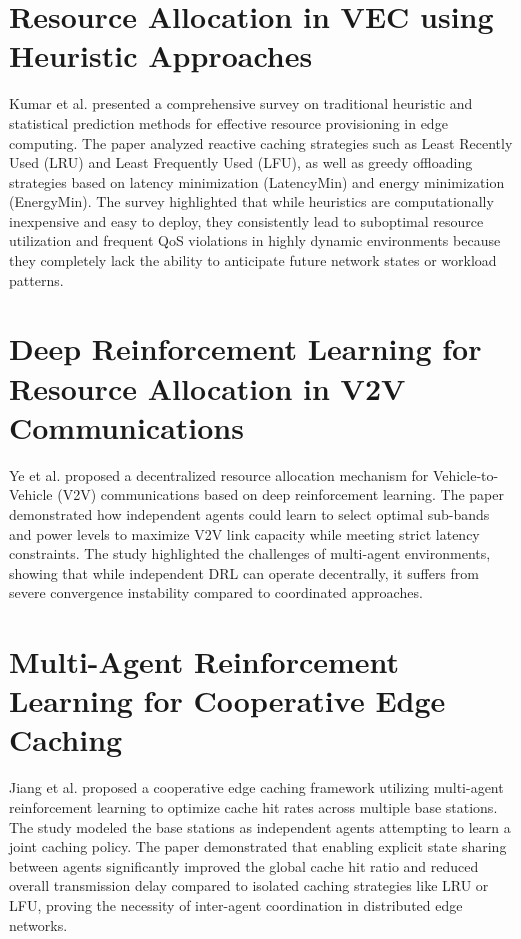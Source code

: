 \documentclass[12pt,a4paper]{report}
\begin{document}
\section{Resource Allocation in VEC using Heuristic Approaches}
Kumar et al. presented a comprehensive survey on traditional heuristic and statistical prediction methods for effective resource provisioning in edge computing. The paper analyzed reactive caching strategies such as Least Recently Used (LRU) and Least Frequently Used (LFU), as well as greedy offloading strategies based on latency minimization (LatencyMin) and energy minimization (EnergyMin). The survey highlighted that while heuristics are computationally inexpensive and easy to deploy, they consistently lead to suboptimal resource utilization and frequent QoS violations in highly dynamic environments because they completely lack the ability to anticipate future network states or workload patterns.

\section{Deep Reinforcement Learning for Resource Allocation in V2V Communications}
Ye et al. proposed a decentralized resource allocation mechanism for Vehicle-to-Vehicle (V2V) communications based on deep reinforcement learning. The paper demonstrated how independent agents could learn to select optimal sub-bands and power levels to maximize V2V link capacity while meeting strict latency constraints. The study highlighted the challenges of multi-agent environments, showing that while independent DRL can operate decentrally, it suffers from severe convergence instability compared to coordinated approaches.

\section{Multi-Agent Reinforcement Learning for Cooperative Edge Caching}
Jiang et al. proposed a cooperative edge caching framework utilizing multi-agent reinforcement learning to optimize cache hit rates across multiple base stations. The study modeled the base stations as independent agents attempting to learn a joint caching policy. The paper demonstrated that enabling explicit state sharing between agents significantly improved the global cache hit ratio and reduced overall transmission delay compared to isolated caching strategies like LRU or LFU, proving the necessity of inter-agent coordination in distributed edge networks.
\end{document}
